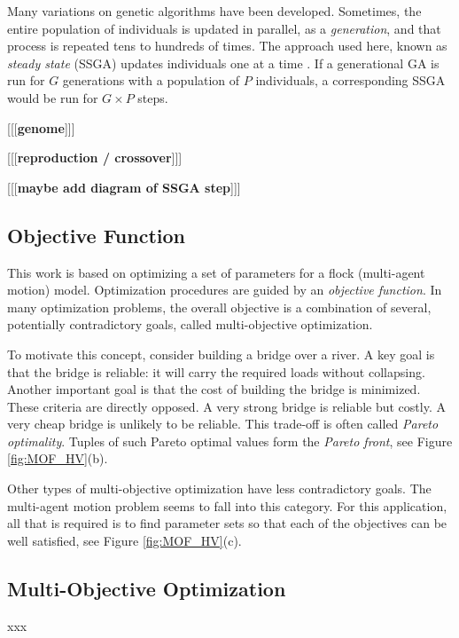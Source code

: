 \documentclass[letterpaper]{article}
\begin{document}
Many variations on genetic algorithms have been developed. Sometimes, the entire population of individuals is updated in parallel, as a \textit{generation}, and that process is repeated tens to hundreds of times. The approach used here, known as \textit{steady state} (SSGA) updates individuals one at a time \citep{syswerda_study_1991}. If a generational GA is run for $G$ generations with a population of $P$ individuals, a corresponding SSGA would be run for $G{\times}P$ steps.

[[[\textbf{genome}]]]

[[[\textbf{reproduction / crossover}]]]

[[[\textbf{maybe add diagram of SSGA step}]]]

\subsection{Objective Function}
\label{subsec:ObjectiveFunction}

This work is based on optimizing a set of parameters for a flock (multi-agent motion) model. Optimization procedures are guided by an \textit{objective function}. In many optimization problems, the overall objective is a combination of several, potentially contradictory goals, called multi-objective optimization. 

To motivate this concept, consider building a bridge over a river. A key goal is that the bridge is reliable: it will carry the required loads without collapsing. Another important goal is that the cost of building the bridge is minimized. These criteria are directly opposed. A very strong bridge is reliable but costly. A very cheap bridge is unlikely to be reliable. This trade-off is often called \textit{Pareto optimality}. Tuples of such Pareto optimal values form the \textit{Pareto front}, see Figure \ref{fig:MOF_HV}(b).

Other types of multi-objective optimization have less contradictory goals. The multi-agent motion problem seems to fall into this category. For this application, all that is required is to find parameter sets so that each of the objectives can be well satisfied, see Figure \ref{fig:MOF_HV}(c).

\subsection{Multi-Objective Optimization}
\label{subsec:Multi-Objective}

xxx
\end{document}
